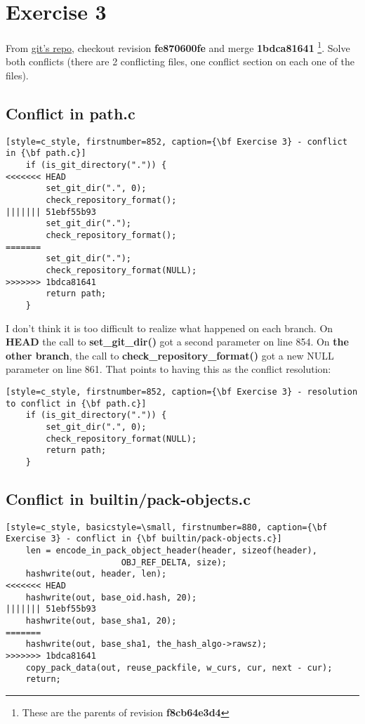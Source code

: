\section{Exercise 3}
\label{exercise_03}
From \hyperref[git_repo]{git's repo}, checkout revision {\bf fe870600fe} and merge {\bf 1bdca81641}
\footnote{These are the parents of revision {\bf f8cb64e3d4}}. Solve both conflicts (there are 2 conflicting files,
one conflict section on each one of the files).

\subsection*{Conflict in path.c}
\begin{lstlisting}[style=c_style, firstnumber=852, caption={\bf Exercise 3} - conflict in {\bf path.c}]
	if (is_git_directory(".")) {
<<<<<<< HEAD
		set_git_dir(".", 0);
		check_repository_format();
||||||| 51ebf55b93
		set_git_dir(".");
		check_repository_format();
=======
		set_git_dir(".");
		check_repository_format(NULL);
>>>>>>> 1bdca81641
		return path;
	}
\end{lstlisting}
I don't think it is too difficult to realize what happened on each branch. On {\bf HEAD} the call to {\bf set\_git\_dir()} got a second
parameter on line 854. On {\bf the other branch}, the call to {\bf check\_repository\_format()} got a new NULL parameter on line 861.
That points to having this as the conflict resolution:

\begin{lstlisting}[style=c_style, firstnumber=852, caption={\bf Exercise 3} - resolution to conflict in {\bf path.c}]
	if (is_git_directory(".")) {
		set_git_dir(".", 0);
		check_repository_format(NULL);
		return path;
	}
\end{lstlisting}

\subsection*{Conflict in builtin/pack-objects.c}
\begin{lstlisting}[style=c_style, basicstyle=\small, firstnumber=880, caption={\bf Exercise 3} - conflict in {\bf builtin/pack-objects.c}]
	len = encode_in_pack_object_header(header, sizeof(header),
					   OBJ_REF_DELTA, size);
	hashwrite(out, header, len);
<<<<<<< HEAD
	hashwrite(out, base_oid.hash, 20);
||||||| 51ebf55b93
	hashwrite(out, base_sha1, 20);
=======
	hashwrite(out, base_sha1, the_hash_algo->rawsz);
>>>>>>> 1bdca81641
	copy_pack_data(out, reuse_packfile, w_curs, cur, next - cur);
	return;
\end{lstlisting}

